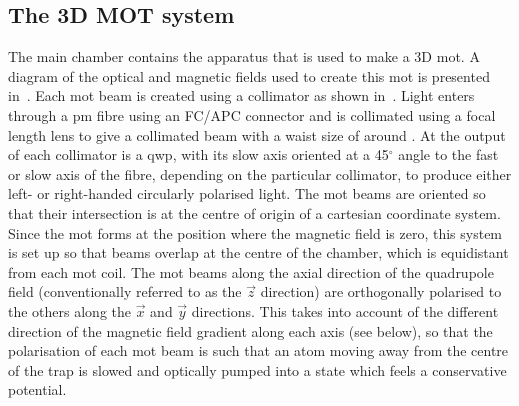 \subsection{The 3D MOT system}\label{sec:3d_mot}
The main chamber contains the apparatus that is used to make a 3D \ac{mot}. A
diagram of the optical and magnetic fields used to create this \ac{mot} is
presented in~. Each \ac{mot} beam is created using a
collimator as shown in~. Light enters through a
\ac{pm} fibre using an FC/APC connector and is collimated using a
 focal length lens to give a collimated beam with a
waist size of around . At the output of each
collimator is a \ac{qwp}, with its slow axis oriented at a 45\(^\circ\) angle
to the fast or slow axis of the fibre, depending on the particular
collimator, to produce either left- or right-handed circularly polarised
light. The \ac{mot} beams are oriented so that their intersection is at the
centre of origin of a cartesian coordinate system. Since the \ac{mot} forms
at the position where the magnetic field is zero, this system is set up so
that beams overlap at the centre of the chamber, which is equidistant from
each \ac{mot} coil. The \ac{mot} beams along the axial direction of the
quadrupole field (conventionally referred to as the \(\vec{z}\) direction)
are orthogonally polarised to the others along the \(\vec{x}\) and
\(\vec{y}\) directions. This takes into account of the different direction of
the magnetic field gradient along each axis (see below), so that the
polarisation of each \ac{mot} beam is such that an atom moving away from the
centre of the trap is slowed and optically pumped into a state which feels a
conservative potential.

